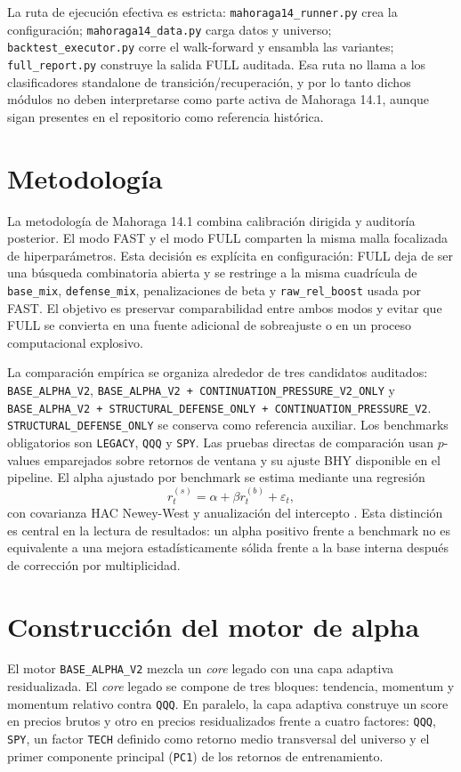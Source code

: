 \documentclass[11pt]{article}
\begin{document}
La ruta de ejecuci\'on efectiva es estricta: \texttt{mahoraga14\_runner.py} crea la configuraci\'on; \texttt{mahoraga14\_data.py} carga datos y universo; \texttt{backtest\_executor.py} corre el walk-forward y ensambla las variantes; \texttt{full\_report.py} construye la salida FULL auditada. Esa ruta no llama a los clasificadores standalone de transici\'on/recuperaci\'on, y por lo tanto dichos m\'odulos no deben interpretarse como parte activa de Mahoraga 14.1, aunque sigan presentes en el repositorio como referencia hist\'orica.

\section{Metodolog\'ia}
La metodolog\'ia de Mahoraga 14.1 combina calibraci\'on dirigida y auditor\'ia posterior. El modo FAST y el modo FULL comparten la misma malla focalizada de hiperpar\'ametros. Esta decisi\'on es expl\'icita en configuraci\'on: FULL deja de ser una b\'usqueda combinatoria abierta y se restringe a la misma cuadr\'icula de \texttt{base\_mix}, \texttt{defense\_mix}, penalizaciones de beta y \texttt{raw\_rel\_boost} usada por FAST. El objetivo es preservar comparabilidad entre ambos modos y evitar que FULL se convierta en una fuente adicional de sobreajuste o en un proceso computacional explosivo.

La comparaci\'on emp\'irica se organiza alrededor de tres candidatos auditados: \texttt{BASE\_ALPHA\_V2}, \texttt{BASE\_ALPHA\_V2 + CONTINUATION\_PRESSURE\_V2\_ONLY} y \texttt{BASE\_ALPHA\_V2 + STRUCTURAL\_DEFENSE\_ONLY + CONTINUATION\_PRESSURE\_V2}. \texttt{STRUCTURAL\_DEFENSE\_ONLY} se conserva como referencia auxiliar. Los benchmarks obligatorios son \texttt{LEGACY}, \texttt{QQQ} y \texttt{SPY}. Las pruebas directas de comparaci\'on usan $p$-values emparejados sobre retornos de ventana y su ajuste BHY disponible en el pipeline. El alpha ajustado por benchmark se estima mediante una regresi\'on
\begin{equation}
r^{(s)}_t = \alpha + \beta r^{(b)}_t + \varepsilon_t,
\end{equation}
con covarianza HAC Newey-West y anualizaci\'on del intercepto \cite{NeweyWest1987}. Esta distinci\'on es central en la lectura de resultados: un alpha positivo frente a benchmark no es equivalente a una mejora estad\'isticamente s\'olida frente a la base interna despu\'es de correcci\'on por multiplicidad.

\section{Construcci\'on del motor de alpha}
El motor \texttt{BASE\_ALPHA\_V2} mezcla un \textit{core} legado con una capa adaptiva residualizada. El \textit{core} legado se compone de tres bloques: tendencia, momentum y momentum relativo contra \texttt{QQQ}. En paralelo, la capa adaptiva construye un score en precios brutos y otro en precios residualizados frente a cuatro factores: \texttt{QQQ}, \texttt{SPY}, un factor \texttt{TECH} definido como retorno medio transversal del universo y el primer componente principal (\texttt{PC1}) de los retornos de entrenamiento.
\end{document}
